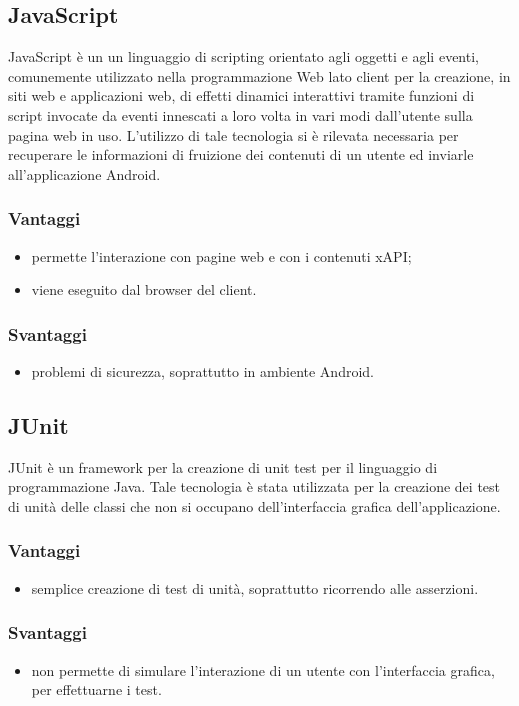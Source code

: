 \documentclass[../Tesi.tex]{subfiles}
\begin{document}
	\subsection{JavaScript}
		JavaScript è un un linguaggio di scripting orientato agli oggetti e agli eventi, comunemente utilizzato nella programmazione Web lato client per la creazione, in siti web e applicazioni web, di effetti dinamici interattivi tramite funzioni di script invocate da eventi innescati a loro volta in vari modi dall'utente sulla pagina web in uso. L'utilizzo di tale tecnologia si è rilevata necessaria per recuperare le informazioni di fruizione dei contenuti di un utente ed inviarle all'applicazione Android. 
		\subsubsection{Vantaggi}
			\begin{itemize}
				\item permette l'interazione con pagine web e con i contenuti xAPI;
				\item viene eseguito dal browser del client.
			\end{itemize}
		\subsubsection{Svantaggi}
			\begin{itemize}
				\item problemi di sicurezza, soprattutto in ambiente Android.
			\end{itemize}

	\subsection{JUnit}
		JUnit è un framework per la creazione di unit test per il linguaggio di programmazione Java. Tale tecnologia è stata utilizzata per la creazione dei test di unità delle classi che non si occupano dell'interfaccia grafica dell'applicazione.
		\subsubsection{Vantaggi}
			\begin{itemize}
				\item semplice creazione di test di unità, soprattutto ricorrendo alle asserzioni.
			\end{itemize}
		\subsubsection{Svantaggi}
			\begin{itemize}
				\item non permette di simulare l'interazione di un utente con l'interfaccia grafica, per effettuarne i test.
			\end{itemize}
\end{document}
